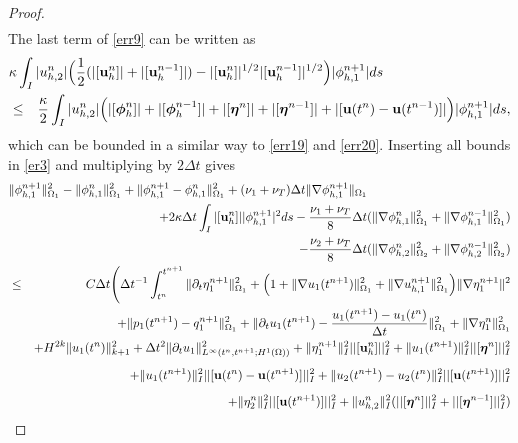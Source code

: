 \documentclass[10pt]{article}%
\numberwithin{equation}{section}
\begin{document}
\begin{proof}
\begin{eqnarray}
	\end{eqnarray}
	The last term of \eqref{err9} can be written as
	\begin{eqnarray}
	\lefteqn{\kappa \int_{I}|u_{h,2}^n|\Big(\frac{1}{2}(|[{\bf u}_h^{n}]|+|[{\bf u}_h^{n-1}]|)-|[{\bf u}_h^n]|^{1/2}|[{\bf u}_h^{n-1}]|^{1/2}\Big)|\phi_{h,1}^{n+1}|ds}\nonumber\\&\leq&\frac{\kappa}{2} \int_{I}|u_{h,2}^n|\Big(|[\boldsymbol{\phi}_h^n]|+|[\boldsymbol{\phi}_h^{n-1}]|+|[\boldsymbol{\eta}^n]|+|[\boldsymbol{\eta}^{n-1}]|+|[{\bf u}(t^n)-{\bf u}(t^{n-1})]|\Big)|\phi_{h,1}^{n+1}|ds, \label{err21}
	\end{eqnarray}
	which can be bounded in a similar way to \eqref{err19} and \eqref{err20}. Inserting all bounds 	in \eqref{er3} and multiplying by $2\Delta t$ %
gives
	\begin{eqnarray}
	\lefteqn{{\|\phi_{h,1}^{n+1}\|_{\Omega_1}^2-\|\phi_{h,1}^{n}\|_{\Omega_1}^2} +\|\phi_{h,1}^{n+1}-\phi_{h,1}^{n}\|_{\Omega_1}^2 +(\nu_1+\nu_T)\Delta t\|\nabla  \phi_{h,1}^{n+1}\|_{\Omega_1}}
	\nonumber\\&&+2\kappa\Delta t \int_{I}|[{\bf u}_h^n]|  |\phi_{h,1}^{n+1}|^2ds-\frac{{ \nu_1+\nu_T}}{8}\Delta t(\|\nabla{\bf \phi}_{h,1}^n\|^2_{\Omega_1}+\|\nabla {\bf \phi}_{h,1}^{n-1}\|^2_{\Omega_1})\nonumber\allowdisplaybreaks\\&&-\frac{{ \nu_2+\nu_T}}{8}\Delta t(\|\nabla{\bf \phi}_{h,2}^n\|^2_{\Omega_2}+\|\nabla {\bf \phi}_{h,2}^{n-1}\|^2_{\Omega_2})\nonumber\allowdisplaybreaks\\&\leq& C\Delta t\Bigg(\Delta t^{-1}\int_{t^n}^{t^{n+1}}\|\partial_t\eta_{1}^{n+1}\|_{\Omega_1}^2+\Big(1+\|\nabla u_{1}(t^{n+1})\|_{\Omega_1}^2+\|\nabla u_{h,1}^{n+1}\|_{\Omega_1}^2\Big)\|\nabla \eta_1^{n+1}\|^2\nonumber\\&&+\|p_1(t^{n+1})-q_1^{n+1}\|_{\Omega_1}^2+\|\partial_t u_1(t^{n+1})-\frac{{u_1(t^{n+1})}-u_{1}(t^{n})}{\Delta t}\|_{\Omega_1}^2+\|\nabla \eta_1^n\|_{\Omega_1}^2\nonumber\\&&+H^{2k}\|u_1(t^n)\|_{k+1}^2+\Delta t^2\|\partial_t u_1\|_{L^{\infty}(t^n,t^{n+1};H^1(\Omega))}^2+\|\eta_{1}^{n+1}\|_I^2||[{\bf u}_h^{n}]||^2_I+\|u_1(t^{n+1})\|_I^2||[\boldsymbol{\eta}^n]||^2_I\nonumber\\[5pt]&&
	+\|u_1(t^{n+1})\|_I^2||[{\bf u}(t^n)-{\bf u}(t^{n+1})]||^2_I+\|u_{2}(t^{n+1})-u_{2}(t^{n})\|_I^2||[{\bf u}(t^{n+1})]||^2_I\nonumber\\[5pt]
	&&+\|\eta_{2}^n\|_I^2||[{\bf u}(t^{n+1})]||^2_I+\|u_{h,2}^n\|_I^2(||[\boldsymbol{ \eta}^n]||^2_I+||[\boldsymbol{\eta}^{n-1}]||^2_I)\nonumber\\

\end{eqnarray}
\end{proof}
\end{document}

